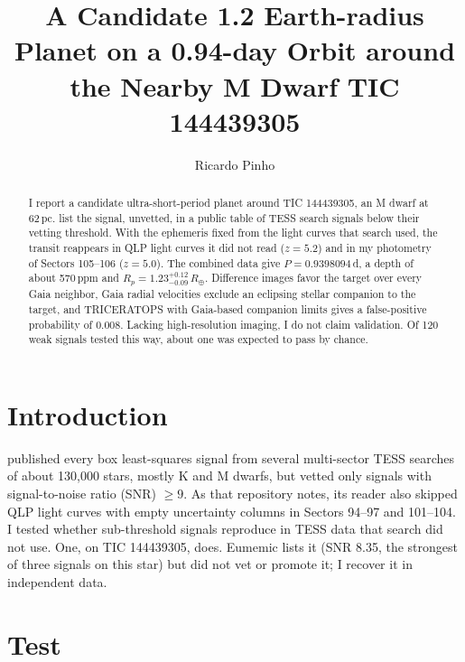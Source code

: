 \documentclass{aastex701}
\begin{document}
\title{A Candidate 1.2 Earth-radius Planet on a 0.94-day Orbit around the Nearby M Dwarf TIC 144439305}

\author[orcid=0009-0006-2744-2599,gname=Ricardo,sname=Pinho]{Ricardo Pinho}

\begin{abstract}
I report a candidate ultra-short-period planet around TIC 144439305, an M dwarf at 62\,pc. \citet{Eumemic2026} list the signal, unvetted, in a public table of TESS search signals below their vetting threshold. With the ephemeris fixed from the light curves that search used, the transit reappears in QLP light curves it did not read ($z=5.2$) and in my photometry of Sectors 105--106 ($z=5.0$). The combined data give $P=0.9398094$\,d, a depth of about 570\,ppm and $R_p=1.23^{+0.12}_{-0.09}\,R_\oplus$. Difference images favor the target over every Gaia neighbor, Gaia radial velocities exclude an eclipsing stellar companion to the target, and TRICERATOPS with Gaia-based companion limits gives a false-positive probability of 0.008. Lacking high-resolution imaging, I do not claim validation. Of 120 weak signals tested this way, about one was expected to pass by chance.
\end{abstract}


\section{Introduction}

\citet{Eumemic2026} published every box least-squares signal from several multi-sector TESS \citep{2015JATIS...1a4003R} searches of about 130,000 stars, mostly K and M dwarfs, but vetted only signals with signal-to-noise ratio (SNR) $\ge9$. As that repository notes, its reader also skipped QLP light curves with empty uncertainty columns in Sectors 94--97 and 101--104. I tested whether sub-threshold signals reproduce in TESS data that search did not use. One, on TIC 144439305, does. Eumemic lists it (SNR 8.35, the strongest of three signals on this star) but did not vet or promote it; I recover it in independent data.

\section{Test}
\end{document}
